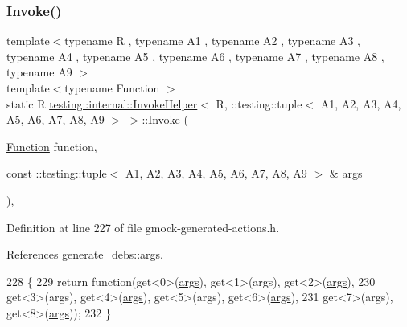 \subsubsection{\texorpdfstring{Invoke()}{Invoke()}}
{\footnotesize\ttfamily template$<$typename R , typename A1 , typename A2 , typename A3 , typename A4 , typename A5 , typename A6 , typename A7 , typename A8 , typename A9 $>$ \\
template$<$typename Function $>$ \\
static R \hyperlink{classtesting_1_1internal_1_1InvokeHelper}{testing\+::internal\+::\+Invoke\+Helper}$<$ R, \+::testing\+::tuple$<$ A1, A2, A3, A4, A5, A6, A7, A8, A9 $>$ $>$\+::Invoke (\begin{DoxyParamCaption}\item[{\hyperlink{structtesting_1_1internal_1_1Function}{Function}}]{function,  }\item[{const \+::testing\+::tuple$<$ A1, A2, A3, A4, A5, A6, A7, A8, A9 $>$ \&}]{args }\end{DoxyParamCaption})\hspace{0.3cm}{\ttfamily [inline]}, {\ttfamily [static]}}



Definition at line 227 of file gmock-\/generated-\/actions.\+h.



References generate\+\_\+debs\+::args.


\begin{DoxyCode}
228                              \{
229            \textcolor{keywordflow}{return} \textcolor{keyword}{function}(get<0>(\hyperlink{namespacegenerate__debs_a75f9143e38df82d83b2e8a6f99cae02c}{args}), get<1>(args), get<2>(\hyperlink{namespacegenerate__debs_a75f9143e38df82d83b2e8a6f99cae02c}{args}),
230                get<3>(args), get<4>(\hyperlink{namespacegenerate__debs_a75f9143e38df82d83b2e8a6f99cae02c}{args}), get<5>(args), get<6>(\hyperlink{namespacegenerate__debs_a75f9143e38df82d83b2e8a6f99cae02c}{args}),
231                get<7>(args), get<8>(\hyperlink{namespacegenerate__debs_a75f9143e38df82d83b2e8a6f99cae02c}{args}));
232   \}
\end{DoxyCode}
\mbox{\label{classtesting_1_1internal_1_1InvokeHelper_3_01R_00_01_1_1testing_1_1tuple_3_01A1_00_01A2_00_01A3_1c5f66c8b5e7674a520f1ea38507628c_ab468cf4a3e1ff2fa33a60ce3459c17f7}} 
